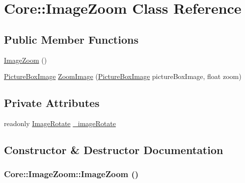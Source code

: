 \hypertarget{class_core_1_1_image_zoom}{
\section{Core::ImageZoom Class Reference}
\label{class_core_1_1_image_zoom}
}
\subsection*{Public Member Functions}
\begin{DoxyCompactItemize}
\item 
\hyperlink{class_core_1_1_image_zoom_a99c12652aaf2e870faed5394e2166044}{ImageZoom} ()
\item 
\hyperlink{class_core_1_1_images_1_1_picture_box_image}{PictureBoxImage} \hyperlink{class_core_1_1_image_zoom_acf72703a1e7bbe863f408a3d509055f8}{ZoomImage} (\hyperlink{class_core_1_1_images_1_1_picture_box_image}{PictureBoxImage} pictureBoxImage, float zoom)
\end{DoxyCompactItemize}
\subsection*{Private Attributes}
\begin{DoxyCompactItemize}
\item 
readonly \hyperlink{class_core_1_1_image_rotate}{ImageRotate} \hyperlink{class_core_1_1_image_zoom_ac172e8d206911a595df13e8711b3fed7}{\_\-imageRotate}
\end{DoxyCompactItemize}


\subsection{Constructor \& Destructor Documentation}
\hypertarget{class_core_1_1_image_zoom_a99c12652aaf2e870faed5394e2166044}{
\subsubsection[{ImageZoom}]{\setlength{\rightskip}{0pt plus 5cm}Core::ImageZoom::ImageZoom ()}}
\label{class_core_1_1_image_zoom_a99c12652aaf2e870faed5394e2166044}


